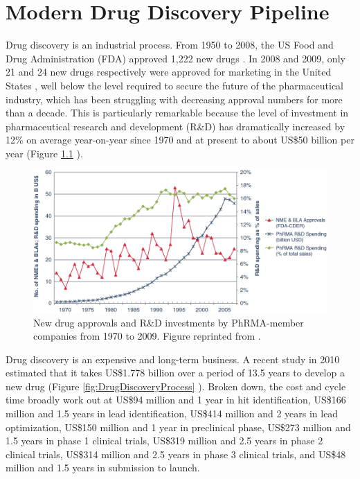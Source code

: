 \chapter{Modern Drug Discovery Pipeline}

Drug discovery is an industrial process. From 1950 to 2008, the US Food and Drug Administration (FDA) approved 1,222 new drugs \citep{717}. In 2008 and 2009, only 21 and 24 new drugs respectively were approved for marketing in the United States \citep{716}, well below the level required to secure the future of the pharmaceutical industry, which has been struggling with decreasing approval numbers for more than a decade. This is particularly remarkable because the level of investment in pharmaceutical research and development (R\&D) has dramatically increased by 12\% on average year-on-year since 1970 and at present to about US\$50 billion per year (Figure \ref{fig:NewDrugApprovals} \citep{686}).

\begin{figure}
\centering
\includegraphics[width=\textwidth]{Background/NewDrugApprovals.png}
\caption{New drug approvals and R\&D investments by PhRMA-member companies from 1970 to 2009. Figure reprinted from \citep{686}.}
\label{fig:NewDrugApprovals}
\end{figure}

Drug discovery is an expensive and long-term business. A recent study in 2010 estimated that it takes US\$1.778 billion over a period of 13.5 years to develop a new drug (Figure \ref{fig:DrugDiscoveryProcess} \citep{716}). Broken down, the cost and cycle time broadly work out at US\$94 million and 1 year in hit identification, US\$166 million and 1.5 years in lead identification, US\$414 million and 2 years in lead optimization, US\$150 million and 1 year in preclinical phase, US\$273 million and 1.5 years in phase 1 clinical trials, US\$319 million and 2.5 years in phase 2 clinical trials, US\$314 million and 2.5 years in phase 3 clinical trials, and US\$48 million and 1.5 years in submission to launch.


